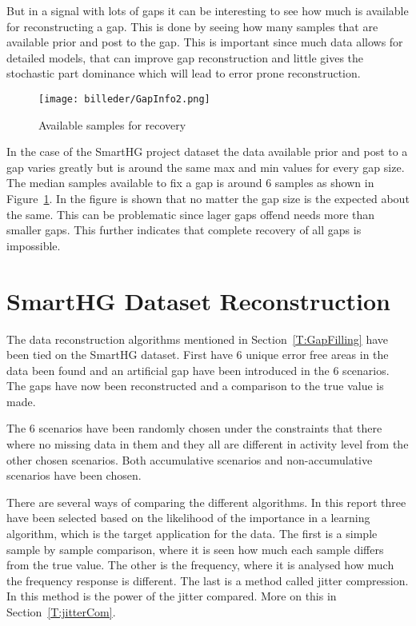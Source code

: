 But in a signal with lots of gaps it can be interesting to see how much  is available for reconstructing a gap. This is done by seeing how many samples that are available prior and post to the gap. This is important since much data allows for detailed models, that can improve gap reconstruction and little  gives the stochastic part dominance which will lead to error prone reconstruction. 

\begin{figure}[H]
\centering
\texttt{[image: billeder/GapInfo2.png]}\caption{Available samples for recovery}
\label{fig:PAF}
\end{figure}

In the case of the SmartHG project dataset the data available prior and post to a gap varies greatly but is around the same max and min values for every gap size. The median samples available to fix a gap is around 6 samples as shown in Figure~\ref{fig:PAF}. In the figure is shown that no matter the gap size is the expected  about the same. This can be problematic since lager gaps offend needs more  than smaller gaps. This further indicates that complete recovery of all gaps is impossible. 

\section{SmartHG Dataset Reconstruction}
The data reconstruction algorithms mentioned in Section~\ref{T:GapFilling} have been tied on the SmartHG dataset. First have 6 unique error free areas in the data been found and an artificial gap have been introduced in the 6 scenarios. 
The gaps have now been reconstructed and a comparison to the true value is made. 

The 6 scenarios have been randomly chosen under the constraints that there where no missing data in them and they all are different in activity level from the other chosen scenarios. Both accumulative scenarios and non-accumulative scenarios have been chosen. 

There are several ways of comparing the different algorithms. In this report three have been selected based on the likelihood of the importance in a learning algorithm, which is the target application for the data. The first is a simple sample by sample comparison, where it is seen how much each sample differs from the true value. The other is the frequency, where it is analysed how much the frequency response is different. The last is a method called jitter compression. In this method is the power of the jitter compared. More on this in Section~\ref{T:jitterCom}.

